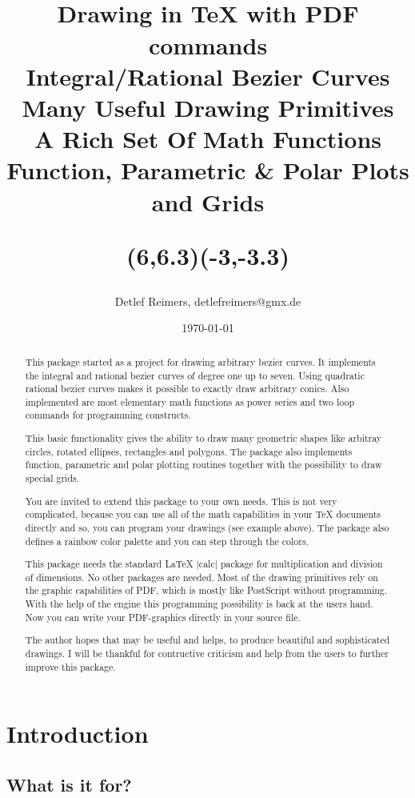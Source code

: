 \documentclass[a4paper,11pt]{article}
\title{\Huge{\bf\Lapdf} \\ \vspace{0.5cm}
 \Large Drawing in \TeX{} with PDF commands \\ \vspace{0.5cm}
 \normalsize Integral/Rational Bezier Curves \\
 Many Useful Drawing Primitives \\
 A Rich Set Of Math Functions \\
 Function, Parametric \& Polar Plots and Grids \\ \vspace{0.8cm}
 \begin{lapdf}(6,6.3)(-3,-3.3)
  \Whilenum{\n<360}{%
  \Nextcol(0,23) \Rad(\n,\a)
  \Cos(\Np\a,\x) \Add(\x,\x)
  \Sin(\Np\a,\y) \Add(\y,\y)
  \Circle(64)(\Np\x,\Np\y,1.5) \Stroke
  \Add(\n,15)}
 \end{lapdf}}
\author{Detlef Reimers, detlefreimers@gmx.de}
\date{\today}
\begin{document}
\maketitle

\begin{abstract}
This package started as a project for drawing arbitrary bezier curves.
It implements the integral and rational bezier curves of degree one up
to seven. Using quadratic rational bezier curves makes it possible to
exactly draw arbitrary conics. Also implemented are most elementary math
functions as power series and two loop commands for programming constructs.

This basic functionality gives the ability to draw many geometric
shapes like arbitray circles, rotated ellipses, rectangles and polygons.
The package also implements function, parametric and polar plotting
routines together with the possibility to draw special grids.

You are invited to extend this package to your own needs. This is not
very complicated, because you can use all of the math capabilities in
your \TeX{} documents directly and so, you can program your drawings
(see example above). The package also defines a rainbow color palette
and you can step through the colors.

This package needs the standard \LaTeX{} |calc| package for multiplication
and division of dimensions. No other packages are needed. Most of the drawing
primitives rely on the graphic capabilities of PDF, which is mostly like
PostScript without programming. With the help of the \pdfTeX{} engine this
programming possibility is back at the users hand. Now you can write your
PDF-graphics directly in your \pdfTeX{} source file.

The author hopes that \Lapdf{} may be useful and helps, to produce beautiful
and sophisticated drawings. I will be thankful for contructive criticism and
help from the users to further improve this package.
\end{abstract}

\tableofcontents
\parskip0.2cm

\section{Introduction}

\subsection{What is it for?}
\end{document}
